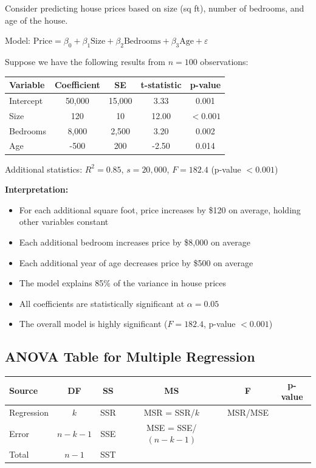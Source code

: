 \documentclass[twoside]{book}
\begin{document}
Consider predicting house prices based on size (sq ft), number of bedrooms, and age of the house.

Model: $\text{Price} = \beta_0 + \beta_1 \text{Size} + \beta_2 \text{Bedrooms} + \beta_3 \text{Age} + \varepsilon$

Suppose we have the following results from $n = 100$ observations:

\begin{center}
\begin{tabular}{|l|c|c|c|c|}
\hline
Variable & Coefficient & SE & t-statistic & p-value \\
\hline
Intercept & 50,000 & 15,000 & 3.33 & 0.001 \\
Size & 120 & 10 & 12.00 & $< 0.001$ \\
Bedrooms & 8,000 & 2,500 & 3.20 & 0.002 \\
Age & -500 & 200 & -2.50 & 0.014 \\
\hline
\end{tabular}
\end{center}

Additional statistics: $R^2 = 0.85$, $s = 20,000$, $F = 182.4$ (p-value $< 0.001$)

\textbf{Interpretation:}
\begin{itemize}
    \item For each additional square foot, price increases by \$120 on average, holding other variables constant
    \item Each additional bedroom increases price by \$8,000 on average
    \item Each additional year of age decreases price by \$500 on average
    \item The model explains 85\% of the variance in house prices
    \item All coefficients are statistically significant at $\alpha = 0.05$
    \item The overall model is highly significant ($F = 182.4$, p-value $< 0.001$)
\end{itemize}

\subsection{ANOVA Table for Multiple Regression}

\begin{center}
\begin{tabular}{|l|c|c|c|c|c|}
\hline
Source & DF & SS & MS & F & p-value \\
\hline
Regression & $k$ & SSR & MSR = SSR/$k$ & MSR/MSE & \\
Error & $n-k-1$ & SSE & MSE = SSE/$(n-k-1)$ & & \\
Total & $n-1$ & SST & & & \\
\hline
\end{tabular}
\end{center}
\end{document}
